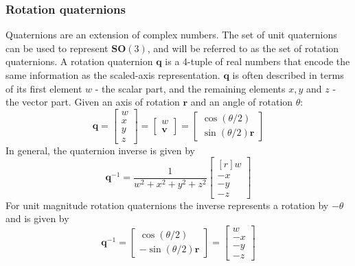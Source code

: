 		\subsubsection{Rotation quaternions}
		Quaternions are an extension of complex numbers. The set of unit quaternions can be used to represent $\mathbf{SO}(3)$, and will be referred to as the set of rotation quaternions. 
		A rotation quaternion $\mathbf{q}$ is a 4-tuple of real numbers that encode the same information as the scaled-axis representation. $\mathbf{q}$ is often described in terms of its first element $w$ - the scalar part, and the remaining elements $x,y$ and $z$ - the vector part. Given an axis of rotation $\mathbf{r}$ and an angle of rotation $\theta$:
		\begin{equation}
			\mathbf{q} = 
			\begin{bmatrix}
				w \\
				x \\
				y \\
				z
			\end{bmatrix}
			 = 
			 \begin{bmatrix}
 				w \\
 				\mathbf{v}
			 \end{bmatrix}
			 =
			 \begin{bmatrix}
			 	\cos(\theta/2) \\
			 	\sin(\theta/2)\mathbf{r}
			 \end{bmatrix}
		\end{equation}
		In general, the quaternion inverse is given by
		\begin{equation}
			\mathbf{q}^{-1} = 
			\frac{1}{w^2 + x^2 + y^2 + z^2}
		 	\begin{bmatrix*}[r]
				 w \\
				-x \\
				-y \\
				-z
			\end{bmatrix*}
		\end{equation}
		For unit magnitude rotation quaternions the inverse represents a rotation by $-\theta$ and is given by
		\begin{equation}
			\mathbf{q}^{-1} = 
			\begin{bmatrix}
			 	\cos(\theta/2) \\
			 	-\sin(\theta/2)\mathbf{r}
		 	\end{bmatrix} =
		 	\begin{bmatrix}
				w \\
				-x \\
				-y \\
				-z
			\end{bmatrix}
		\end{equation}
		
